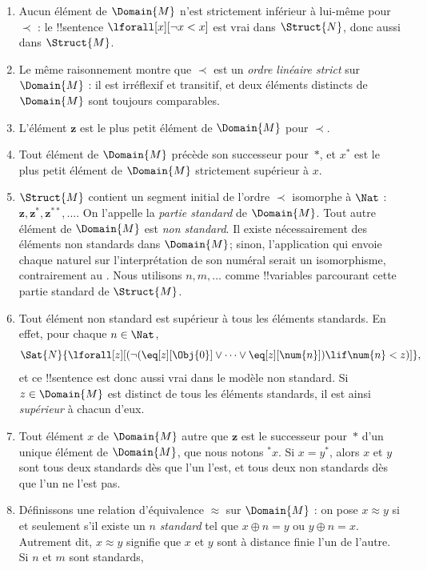 \documentclass[../../../include/open-logic-section]{subfiles}
\begin{document}
\begin{enumerate}
\item Aucun élément de $\Domain{M}$ n'est strictement inférieur
  à lui-même pour $\prec$ : le !!{sentence}
  $\lforall[x][\lnot x < x]$ est vrai dans $\Struct{N}$, donc aussi
  dans $\Struct{M}$.
\item Le même raisonnement montre que $\prec$ est un \emph{ordre
  linéaire strict} sur $\Domain{M}$ : il est irréflexif et transitif,
  et deux éléments distincts de $\Domain{M}$ sont toujours comparables.
\item L'élément $\mathbf{z}$ est le plus petit élément de $\Domain{M}$
  pour $\prec$.
\item Tout élément de $\Domain{M}$ précède son successeur pour~$*$,
  et $x^*$ est le plus petit élément de $\Domain{M}$ strictement
  supérieur à $x$.
\item $\Struct{M}$ contient un segment initial de l'ordre $\prec$
  isomorphe à $\Nat$ : $\mathbf{z}, \mathbf{z}^*, \mathbf{z}^{**}, \dots$.
  On l'appelle la \emph{partie standard} de $\Domain{M}$.
  Tout autre élément de $\Domain{M}$ est \emph{non standard}.
  Il existe nécessairement des éléments non standards dans
  $\Domain{M}$; sinon, l'application qui envoie chaque naturel
  sur l'interprétation de son numéral serait un isomorphisme,
  contrairement au .
  Nous utilisons $n, m, \dots$ comme !!{variable}s parcourant cette
  partie standard de $\Struct{M}$.
\item Tout élément non standard est supérieur à tous les éléments
  standards. En effet, pour chaque $n \in \Nat$,
  \[
  \Sat{N}{\lforall[z][(\lnot(\eq[z][\Obj{0}] \lor
  \dots \lor \eq[z][\num{n}]) \lif \num{n} < z)]},
  \]
  et ce !!{sentence} est donc aussi vrai dans le modèle non standard.
  Si $z \in \Domain{M}$ est distinct de tous les éléments standards,
  il est ainsi \emph{supérieur} à chacun d'eux.
\item Tout élément $x$ de $\Domain{M}$ autre que $\mathbf{z}$ est
  le successeur pour~$*$ d'un unique élément de $\Domain{M}$,
  que nous notons $^*x$. Si $x = y^*$, alors $x$ et $y$ sont tous
  deux standards dès que l'un l'est, et tous deux non standards
  dès que l'un ne l'est pas.
\item Définissons une relation d'équivalence $\approx$ sur
  $\Domain{M}$ : on pose $x \approx y$ si et seulement s'il existe
  un $n$ \emph{standard} tel que $x \oplus n = y$ ou $y \oplus n =x$.
  Autrement dit, $x \approx y$ signifie que $x$ et $y$ sont à
  distance finie l'un de l'autre. Si $n$ et $m$ sont standards,

\end{enumerate}
\end{document}
